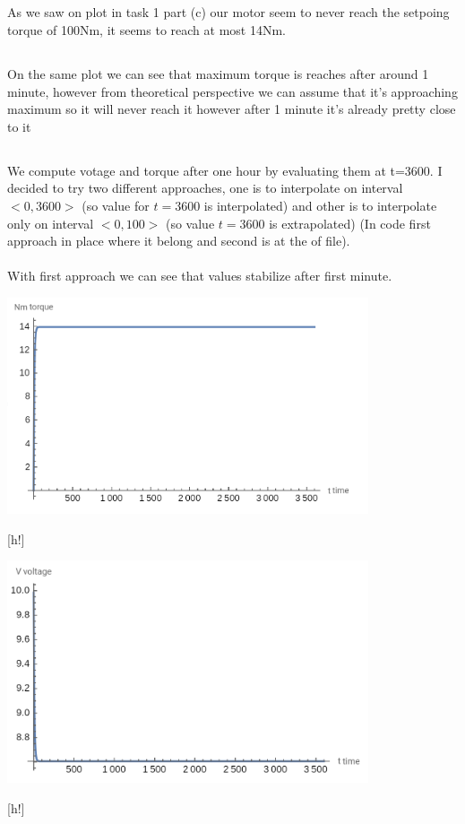 \documentclass[a4paper]{article}
\begin{document}
	\subsection{}
	As we saw on plot in task 1 part (c) our motor seem to never reach the setpoing torque of 100Nm, it seems to reach at most 14Nm.
	
	\subsection{}
	On the same plot we can see that maximum torque is reaches after around 1 minute, however from theoretical perspective we can assume that it's approaching maximum so it will never reach it however after 1 minute it's already pretty close to it
	
	\subsection{}
	We compute votage and torque after one hour by evaluating them at t=3600. I decided to try two different approaches, one is to interpolate on interval $<0, 3600>$ (so value for $t=3600$ is interpolated) and other is to interpolate only on interval $<0, 100>$ (so value $t=3600$ is extrapolated) (In code first approach in place where it belong and second is at the of file).
	\\
	\\ 
	With first approach we can see that values stabilize after first minute.
	\\ 
	\centerline{\includegraphics[width=0.8\textwidth]{2_d_t_1}}[h!]
	\centerline{\includegraphics[width=0.8\textwidth]{2_d_v_1}}[h!]
\end{document}
